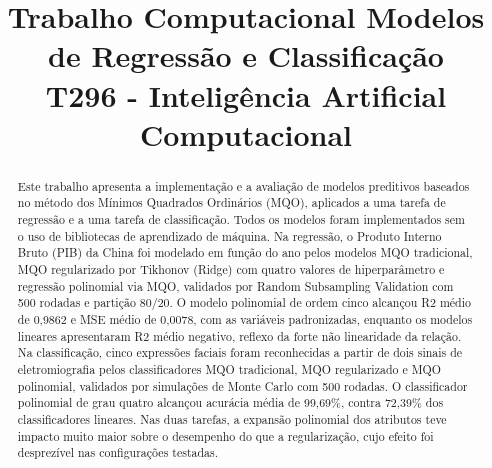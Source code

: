 \documentclass[conference]{IEEEtran}
\begin{document}
\title{Trabalho Computacional Modelos de Regressão e Classificação\\
{\footnotesize T296 - Inteligência Artificial Computacional}}

\author{
\and
{}
\and
{}
}

\maketitle

\begin{abstract}
Este trabalho apresenta a implementação e a avaliação de modelos preditivos
baseados no método dos Mínimos Quadrados Ordinários (MQO), aplicados a uma
tarefa de regressão e a uma tarefa de classificação. Todos os modelos foram
implementados sem o uso de bibliotecas de aprendizado de máquina. Na
regressão, o Produto Interno Bruto (PIB) da China foi modelado em função do
ano pelos modelos MQO tradicional, MQO regularizado por Tikhonov (Ridge) com
quatro valores de hiperparâmetro e regressão polinomial via MQO, validados por
Random Subsampling Validation com 500 rodadas e partição 80/20. O modelo
polinomial de ordem cinco alcançou R2 médio de 0,9862 e MSE médio de 0,0078,
com as variáveis padronizadas, enquanto os modelos lineares apresentaram R2
médio negativo, reflexo da forte não linearidade da relação. Na classificação,
cinco expressões faciais foram reconhecidas a partir de dois sinais de
eletromiografia pelos classificadores MQO tradicional, MQO regularizado e MQO
polinomial, validados por simulações de Monte Carlo com 500 rodadas. O
classificador polinomial de grau quatro alcançou acurácia média de 99,69\%,
contra 72,39\% dos classificadores lineares. Nas duas tarefas, a expansão
polinomial dos atributos teve impacto muito maior sobre o desempenho do que a
regularização, cujo efeito foi desprezível nas configurações testadas.
\end{abstract}
\end{document}
